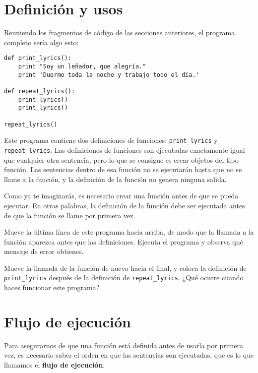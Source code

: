 \section{Definición y usos}

Reuniendo los fragmentos de código de las secciones anteriores, el
programa completo sería algo esto:

\beforeverb
\begin{verbatim}
def print_lyrics():
    print "Soy un leñador, que alegría."
    print 'Duermo toda la noche y trabajo todo el día.'

def repeat_lyrics():
    print_lyrics()
    print_lyrics()

repeat_lyrics()
\end{verbatim}
\afterverb
%
Este programa contiene dos definiciones de funciones: \verb"print_lyrics" y
\verb"repeat_lyrics". Las definiciones de funciones son ejecutadas exactamente
igual que cualquier otra sentencia, pero lo que se consigue es crear objetos del tipo función. Las
sentencias dentro de esa función no se ejecutarán hasta que no se llame a la función,
y la definición de la función no genera ninguna salida.


Como ya te imaginarás, es necesario crear una función antes de que se
pueda ejecutar. En otras palabras, la definición de la función debe ser
ejecutada antes de que la función se llame por primera vez.

\begin{ex}
Mueve la última línea de este programa
hacia arriba, de modo que la llamada a la función aparezca antes que las
definiciones. Ejecuta
el programa y observa qué mensaje
de error obtienes.
\end{ex}

\begin{ex}
Mueve la llamada de la función de nuevo hacia el final,
y coloca la definición de \verb"print_lyrics" después de la definición
de \verb"repeat_lyrics". ¿Qué ocurre cuando haces funcionar este programa?
\end{ex}


\section{Flujo de ejecución}

Para asegurarnos de que una función está definida antes de usarla por primera vez,
es necesario saber el orden en que las sentencias son ejecutadas, que es lo
que llamamos el {\bf flujo de ejecución}.

